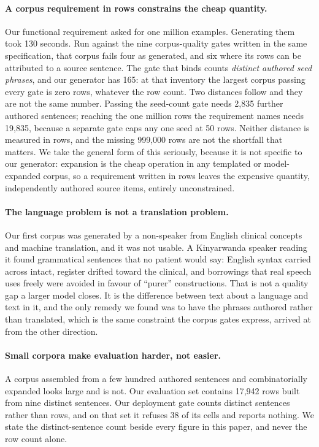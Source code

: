 \paragraph{A corpus requirement in rows constrains the cheap quantity.} Our
functional requirement asked for one million examples. Generating them took 130
seconds. Run against the nine corpus-quality gates written in the same
specification, that corpus fails four as generated, and six where its rows can be
attributed to a source sentence. The gate that binds counts \emph{distinct
authored seed phrases}, and our generator has 165: at that inventory the largest
corpus passing every gate is zero rows, whatever the row count. Two distances
follow and they are not the same number. Passing the seed-count gate needs
2{,}835 further authored sentences; reaching the one million rows the
requirement names needs 19{,}835, because a separate gate caps any one seed at
50 rows. Neither distance is measured in rows, and the missing 999{,}000 rows
are not the shortfall that matters. We take the
general form of this seriously, because it is not specific to our generator:
expansion is the cheap operation in any templated or model-expanded corpus, so a
requirement written in rows leaves the expensive quantity, independently
authored source items, entirely unconstrained.

\paragraph{The language problem is not a translation problem.} Our first corpus
was generated by a non-speaker from English clinical concepts and machine
translation, and it was not usable. A Kinyarwanda speaker reading it found
grammatical sentences that no patient would say: English syntax carried across
intact, register drifted toward the clinical, and borrowings that real speech
uses freely were avoided in favour of ``purer'' constructions. That is not a
quality gap a larger model closes. It is the difference between text about a
language and text in it, and the only remedy we found was to have the phrases
authored rather than translated, which is the same constraint the corpus gates
express, arrived at from the other direction.

\paragraph{Small corpora make evaluation harder, not easier.} A corpus assembled
from a few hundred authored sentences and combinatorially expanded looks large
and is not. Our evaluation set contains 17{,}942 rows built from nine distinct
sentences. Our deployment gate counts distinct sentences rather than rows, and on
that set it refuses 38 of its cells and reports nothing. We state the
distinct-sentence count beside every figure in this paper, and never the row
count alone.

